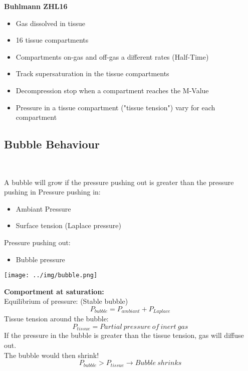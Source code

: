\documentclass[aspectratio=1610,english,14pt]{beamer}
\begin{document}
\begin{frame}{\insertsubsection}
	\textbf{Buhlmann ZHL16}
	\begin{itemize}
	 	\item Gas dissolved in tissue
		\item 16 tissue compartments
		\item Compartments on-gas and off-gas a different rates (Half-Time)
		\item Track supersaturation in the tissue compartments
		\item Decompression stop when a compartment reaches the M-Value
		\item Pressure in a tissue compartment ("tissue tension") vary for each compartment
	 \end{itemize} 
\end{frame}

\subsection{Bubble Behaviour}
	\begin{frame}
		\resizebox{!}{18pt}{\strut\textbf{\insertsubsection}\strut}\\
		\vfill
   \end{frame}

\begin{frame}{\insertsubsection}
	A bubble will grow if the pressure pushing out is greater than the pressure pushing in
	\pause\vfill
	Pressure pushing in:
	\begin{itemize}
		\item Ambiant Pressure
		\item Surface tension (Laplace pressure)
	\end{itemize}
	\pause\vfill
	Pressure pushing out:
	\begin{itemize}
		\item Bubble pressure
	\end{itemize}
\end{frame}

\begin{frame}{\insertsubsection}  
	\centering\texttt{[image: ../img/bubble.png]}
\end{frame}

\begin{frame}{\insertsubsection}
	\textbf{Comportment at saturation:}\\
	\vfill
	Equilibrium of pressure: (Stable bubble)
	$$P_{bubble}=P_{ambiant}+P_{Laplace}$$
	\pause \vfill
	Tissue tension around the bubble:
	$$P_{tissue}=Partial\ pressure\ of\ inert\ gas$$
	\pause \vfill
	If the pressure in the bubble is greater than the tissue tension, gas will diffuse out.\\
	The bubble would then shrink!
	$$P_{bubble}>P_{tissue}\rightarrow Bubble\ shrinks$$
\end{frame}
\end{document}
